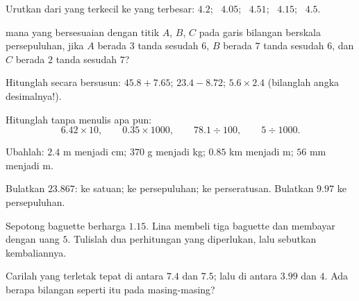 \begin{exercise}[$\star$]\label{exo:g6:decimals:4}
Urutkan dari yang terkecil ke yang terbesar:
$4.2$; \ $4.05$; \ $4.51$; \ $4.15$; \ $4.5$.
\end{exercise}

\begin{exercise}[$\star$]\label{exo:g6:decimals:5}
 mana yang bersesuaian dengan titik $A$, $B$, $C$
pada garis bilangan berskala persepuluhan, jika $A$ berada $3$ tanda
sesudah $6$, $B$ berada $7$ tanda sesudah $6$, dan $C$ berada $2$ tanda sesudah $7$?
\end{exercise}

\begin{exercise}[$\star$]\label{exo:g6:decimals:6}
Hitunglah secara bersusun: $45.8 + 7.65$; \quad $23.4 - 8.72$; \quad
$5.6 \times 2.4$ (bilanglah angka desimalnya!).
\end{exercise}

\begin{exercise}[$\star$]\label{exo:g6:decimals:7}
Hitunglah tanpa menulis apa pun:
\[
6.42 \times 10, \qquad
0.35 \times 1000, \qquad
78.1 \div 100, \qquad
5 \div 1000 .
\]
\end{exercise}

\begin{exercise}[$\star$]\label{exo:g6:decimals:8}
Ubahlah: $2.4$ m menjadi cm; \quad $370$ g menjadi kg; \quad $0.85$
km menjadi m; \quad $56$ mm menjadi m.
\end{exercise}

\begin{exercise}[$\star$]\label{exo:g6:decimals:9}
Bulatkan $23.867$: ke satuan; ke persepuluhan; ke perseratusan.
Bulatkan $9.97$ ke persepuluhan.
\end{exercise}

\begin{exercise}[$\star\star$]\label{exo:g6:decimals:10}
Sepotong baguette berharga $1.15$. Lina membeli tiga baguette dan
membayar dengan uang $5$. Tulislah dua perhitungan yang diperlukan, lalu sebutkan kembaliannya.
\end{exercise}

\begin{exercise}[$\star\star$]\label{exo:g6:decimals:11}
Carilah  yang terletak tepat di antara $7.4$ dan
$7.5$; lalu di antara $3.99$ dan $4$. Ada berapa bilangan seperti itu pada masing-masing?
\end{exercise}

